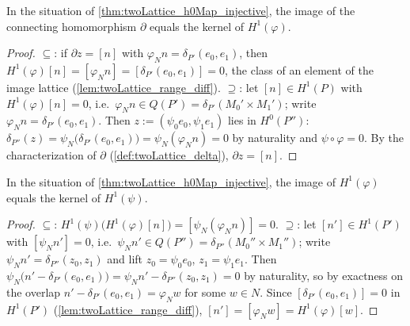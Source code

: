 \begin{theorem}
  \label{thm:twoLattice_exact_delta_h1}
  \leanok
  In the situation of \ref{thm:twoLattice_h0Map_injective}, the image of the
  connecting homomorphism \(\partial\) equals the kernel of \(H^1(\varphi)\).
\end{theorem}
\begin{proof}
  \leanok
  \(\subseteq\): if \(\partial z = [n]\) with \(\varphi_N n = \delta_{P'}(e_0, e_1)\),
  then \(H^1(\varphi)[n] = [\varphi_N n] = [\delta_{P'}(e_0,e_1)] = 0\), the class of
  an element of the image lattice (\ref{lem:twoLattice_range_diff}).
  \(\supseteq\): let \([n] \in H^1(P)\) with \(H^1(\varphi)[n] = 0\), i.e.\
  \(\varphi_N n \in Q(P') = \delta_{P'}(M_0' \times M_1')\); write
  \(\varphi_N n = \delta_{P'}(e_0, e_1)\). Then
  \(z := (\psi_0 e_0, \psi_1 e_1)\) lies in \(H^0(P'')\):
  \(\delta_{P''}(z) = \psi_N\bigl(\delta_{P'}(e_0,e_1)\bigr) = \psi_N(\varphi_N n) = 0\)
  by naturality and \(\psi\circ\varphi = 0\). By the characterization of \(\partial\)
  (\ref{def:twoLattice_delta}), \(\partial z = [n]\).
\end{proof}

\begin{theorem}
  \label{thm:twoLattice_exact_h1_middle}
  \leanok
  In the situation of \ref{thm:twoLattice_h0Map_injective}, the image of
  \(H^1(\varphi)\) equals the kernel of \(H^1(\psi)\).
\end{theorem}
\begin{proof}
  \leanok
  \(\subseteq\): \(H^1(\psi)\bigl(H^1(\varphi)[n]\bigr) = [\psi_N(\varphi_N n)] = 0\).
  \(\supseteq\): let \([n'] \in H^1(P')\) with \([\psi_N n'] = 0\), i.e.\
  \(\psi_N n' \in Q(P'') = \delta_{P''}(M_0'' \times M_1'')\); write
  \(\psi_N n' = \delta_{P''}(z_0, z_1)\) and lift \(z_0 = \psi_0 e_0\),
  \(z_1 = \psi_1 e_1\). Then
  \(\psi_N\bigl(n' - \delta_{P'}(e_0, e_1)\bigr) =
  \psi_N n' - \delta_{P''}(z_0, z_1) = 0\) by naturality, so by exactness on the
  overlap \(n' - \delta_{P'}(e_0,e_1) = \varphi_N w\) for some \(w \in N\). Since
  \([\delta_{P'}(e_0,e_1)] = 0\) in \(H^1(P')\) (\ref{lem:twoLattice_range_diff}),
  \([n'] = [\varphi_N w] = H^1(\varphi)[w]\).
\end{proof}

